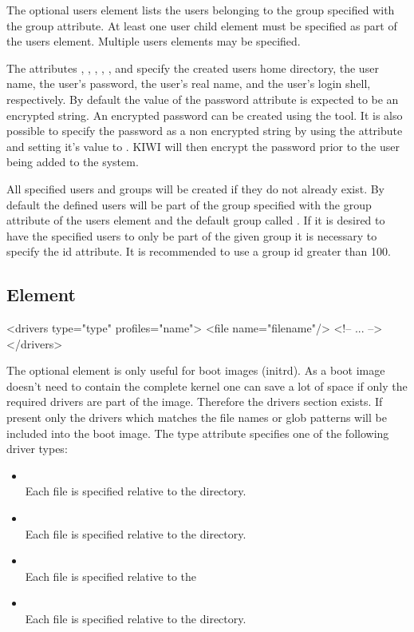 The optional users element lists the users belonging to the group specified
with the group attribute. At least one user child element must be specified
as part of the users element. Multiple users elements may be specified.

The attributes , , , , 
, and  specify the created
users home directory, the user name, the user's password, the user's 
real name, and the user's login shell, respectively. By default the value
of the password attribute is expected to be an encrypted string. An
encrypted password can be created using the  tool. It
is also possible to specify the password as a non encrypted string by using
the  attribute and setting it's value to . KIWI will then
encrypt the password prior to the user being added to the system.

All specified users and groups will be created if they do not already exist.
By default the defined users will be part of the group specified with the 
group attribute of the users element and the default group called .
If it is desired to have the specified users to only be part of the given
group it is necessary to specify the id attribute. It is recommended to use
a group id greater than 100.

\subsection{ Element}
\begin{xml}
<drivers type="type" profiles="name">
  <file name="filename"/>
  <!-- ... -->
</drivers>
\end{xml}

The optional  element is only useful for boot images (initrd).
As a boot image doesn't need to contain the complete kernel one can
save a lot of space if only the required drivers are part of the image.
Therefore the drivers section exists. If present only the drivers which
matches the file names or glob patterns will be included into the
boot image. The type attribute specifies one of the following driver
types:

\begin{itemize}
\item {}\\
      Each file is specified relative to the
       directory.
\item {}\\
      Each file is specified relative to the
      directory.
\item {}\\
      Each file is specified relative to the
\item {}\\
      Each file is specified relative to the
       directory.
\end{itemize}

